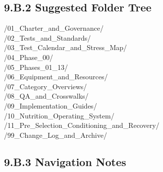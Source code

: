 \documentclass[10pt]{article}
\begin{document}
\subsection*{9.B.2 Suggested Folder Tree}
{}

\begingroup

/01\_Charter\_and\_Governance/\\
/02\_Tests\_and\_Standards/\\
/03\_Test\_Calendar\_and\_Stress\_Map/\\
/04\_Phase\_00/\\
/05\_Phases\_01\_13/\\
/06\_Equipment\_and\_Resources/\\
/07\_Category\_Overviews/\\
/08\_QA\_and\_Crosswalks/\\
/09\_Implementation\_Guides/\\
/10\_Nutrition\_Operating\_System/\\
/11\_Pre\_Selection\_Conditioning\_and\_Recovery/\\
/99\_Change\_Log\_and\_Archive/\\

\endgroup

\subsection*{9.B.3 Navigation Notes}
{}
\end{document}
